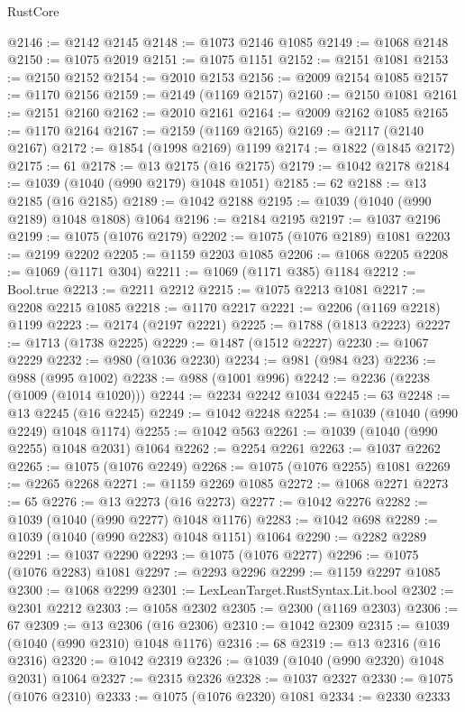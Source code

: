 \begin{lexlean}{RustCore}
\begin{coremodule}
@2146 := @2142 @2145
@2148 := @1073 @2146 @1085
@2149 := @1068 @2148
@2150 := @1075 @2019
@2151 := @1075 @1151
@2152 := @2151 @1081
@2153 := @2150 @2152
@2154 := @2010 @2153
@2156 := @2009 @2154 @1085
@2157 := @1170 @2156
@2159 := @2149 (@1169 @2157)
@2160 := @2150 @1081
@2161 := @2151 @2160
@2162 := @2010 @2161
@2164 := @2009 @2162 @1085
@2165 := @1170 @2164
@2167 := @2159 (@1169 @2165)
@2169 := @2117 (@2140 @2167)
@2172 := @1854 (@1998 @2169) @1199
@2174 := @1822 (@1845 @2172)
@2175 := 61
@2178 := @13 @2175 (@16 @2175)
@2179 := @1042 @2178
@2184 := @1039 (@1040 (@990 @2179) @1048 @1051)
@2185 := 62
@2188 := @13 @2185 (@16 @2185)
@2189 := @1042 @2188
@2195 := @1039 (@1040 (@990 @2189) @1048 @1808) @1064
@2196 := @2184 @2195
@2197 := @1037 @2196
@2199 := @1075 (@1076 @2179)
@2202 := @1075 (@1076 @2189) @1081
@2203 := @2199 @2202
@2205 := @1159 @2203 @1085
@2206 := @1068 @2205
@2208 := @1069 (@1171 @304)
@2211 := @1069 (@1171 @385) @1184
@2212 := Bool.true
@2213 := @2211 @2212
@2215 := @1075 @2213 @1081
@2217 := @2208 @2215 @1085
@2218 := @1170 @2217
@2221 := @2206 (@1169 @2218) @1199
@2223 := @2174 (@2197 @2221)
@2225 := @1788 (@1813 @2223)
@2227 := @1713 (@1738 @2225)
@2229 := @1487 (@1512 @2227)
@2230 := @1067 @2229
@2232 := @980 (@1036 @2230)
@2234 := @981 (@984 @23)
@2236 := @988 (@995 @1002)
@2238 := @988 (@1001 @996)
@2242 := @2236 (@2238 (@1009 (@1014 @1020)))
@2244 := @2234 @2242 @1034
@2245 := 63
@2248 := @13 @2245 (@16 @2245)
@2249 := @1042 @2248
@2254 := @1039 (@1040 (@990 @2249) @1048 @1174)
@2255 := @1042 @563
@2261 := @1039 (@1040 (@990 @2255) @1048 @2031) @1064
@2262 := @2254 @2261
@2263 := @1037 @2262
@2265 := @1075 (@1076 @2249)
@2268 := @1075 (@1076 @2255) @1081
@2269 := @2265 @2268
@2271 := @1159 @2269 @1085
@2272 := @1068 @2271
@2273 := 65
@2276 := @13 @2273 (@16 @2273)
@2277 := @1042 @2276
@2282 := @1039 (@1040 (@990 @2277) @1048 @1176)
@2283 := @1042 @698
@2289 := @1039 (@1040 (@990 @2283) @1048 @1151) @1064
@2290 := @2282 @2289
@2291 := @1037 @2290
@2293 := @1075 (@1076 @2277)
@2296 := @1075 (@1076 @2283) @1081
@2297 := @2293 @2296
@2299 := @1159 @2297 @1085
@2300 := @1068 @2299
@2301 := LexLeanTarget.RustSyntax.Lit.bool
@2302 := @2301 @2212
@2303 := @1058 @2302
@2305 := @2300 (@1169 @2303)
@2306 := 67
@2309 := @13 @2306 (@16 @2306)
@2310 := @1042 @2309
@2315 := @1039 (@1040 (@990 @2310) @1048 @1176)
@2316 := 68
@2319 := @13 @2316 (@16 @2316)
@2320 := @1042 @2319
@2326 := @1039 (@1040 (@990 @2320) @1048 @2031) @1064
@2327 := @2315 @2326
@2328 := @1037 @2327
@2330 := @1075 (@1076 @2310)
@2333 := @1075 (@1076 @2320) @1081
@2334 := @2330 @2333

\end{coremodule}
\end{lexlean}
